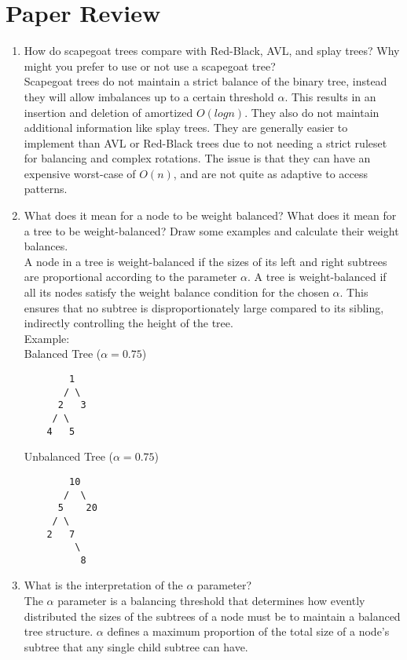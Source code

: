 \documentclass{labReport}
\begin{document}
\section{Paper Review}
\begin{enumerate}
    \item How do scapegoat trees compare with Red-Black, AVL, and splay trees? Why might you prefer to use or not use a scapegoat tree?\\
    Scapegoat trees do not maintain a strict balance of the binary tree, instead they will allow imbalances up to a certain threshold $\alpha$. This results in an insertion and deletion of amortized $O(log n)$. They also do not maintain additional information like splay trees. They are generally easier to implement than AVL or Red-Black trees due to not needing a strict ruleset for balancing and complex rotations. The issue is that they can have an expensive worst-case of $O(n)$, and are not quite as adaptive to access patterns. 
    \item What does it mean for a node to be weight balanced? What does it mean for a tree to be weight-balanced? Draw some examples and calculate their weight balances.\\
    A node in a tree is weight-balanced if the sizes of its left and right subtrees are proportional according to the parameter $\alpha$. A tree is weight-balanced if all its nodes satisfy the weight balance condition for the chosen $\alpha$. This ensures that no subtree is disproportionately large compared to its sibling, indirectly controlling the height of the tree. \\
    Example: \\
    Balanced Tree ($\alpha = 0.75$) \\
    \begin{verbatim}
        1
       / \
      2   3
     / \
    4   5
    \end{verbatim}
    Unbalanced Tree ($\alpha = 0.75$)
    \begin{verbatim}
        10
       /  \
      5    20
     / \
    2   7
         \
          8 
    \end{verbatim}
    \item What is the interpretation of the $\alpha$ parameter?\\
    The $\alpha$ parameter is a balancing threshold that determines how evently distributed the sizes of the subtrees of a node must be to maintain a balanced tree structure. $\alpha$ defines a maximum proportion of the total size of a node's subtree that any single child subtree can have.

\end{enumerate}
\end{document}
